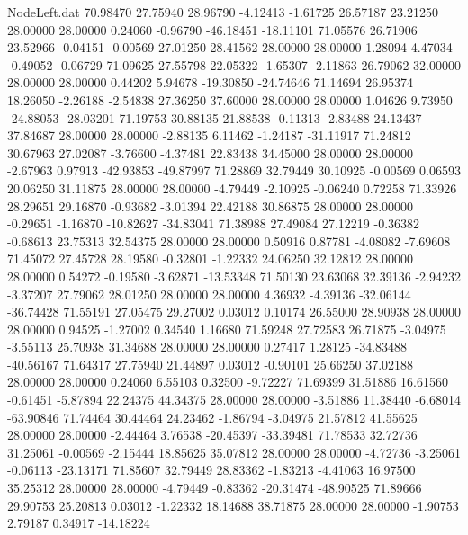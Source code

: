 \begin{filecontents}{NodeLeft.dat}
  70.98470   27.75940   28.96790    -4.12413   -1.61725   26.57187   23.21250   28.00000   28.00000    0.24060   -0.96790  -46.18451  -18.11101
  71.05576   26.71906   23.52966    -0.04151   -0.00569   27.01250   28.41562   28.00000   28.00000    1.28094    4.47034   -0.49052   -0.06729
  71.09625   27.55798   22.05322    -1.65307   -2.11863   26.79062   32.00000   28.00000   28.00000    0.44202    5.94678  -19.30850  -24.74646
  71.14694   26.95374   18.26050    -2.26188   -2.54838   27.36250   37.60000   28.00000   28.00000    1.04626    9.73950  -24.88053  -28.03201
  71.19753   30.88135   21.88538    -0.11313   -2.83488   24.13437   37.84687   28.00000   28.00000   -2.88135    6.11462   -1.24187  -31.11917
  71.24812   30.67963   27.02087    -3.76600   -4.37481   22.83438   34.45000   28.00000   28.00000   -2.67963    0.97913  -42.93853  -49.87997
  71.28869   32.79449   30.10925    -0.00569    0.06593   20.06250   31.11875   28.00000   28.00000   -4.79449   -2.10925   -0.06240    0.72258
  71.33926   28.29651   29.16870    -0.93682   -3.01394   22.42188   30.86875   28.00000   28.00000   -0.29651   -1.16870  -10.82627  -34.83041
  71.38988   27.49084   27.12219    -0.36382   -0.68613   23.75313   32.54375   28.00000   28.00000    0.50916    0.87781   -4.08082   -7.69608
  71.45072   27.45728   28.19580    -0.32801   -1.22332   24.06250   32.12812   28.00000   28.00000    0.54272   -0.19580   -3.62871  -13.53348
  71.50130   23.63068   32.39136    -2.94232   -3.37207   27.79062   28.01250   28.00000   28.00000    4.36932   -4.39136  -32.06144  -36.74428
  71.55191   27.05475   29.27002     0.03012    0.10174   26.55000   28.90938   28.00000   28.00000    0.94525   -1.27002    0.34540    1.16680
  71.59248   27.72583   26.71875    -3.04975   -3.55113   25.70938   31.34688   28.00000   28.00000    0.27417    1.28125  -34.83488  -40.56167
  71.64317   27.75940   21.44897     0.03012   -0.90101   25.66250   37.02188   28.00000   28.00000    0.24060    6.55103    0.32500   -9.72227
  71.69399   31.51886   16.61560    -0.61451   -5.87894   22.24375   44.34375   28.00000   28.00000   -3.51886   11.38440   -6.68014  -63.90846
  71.74464   30.44464   24.23462    -1.86794   -3.04975   21.57812   41.55625   28.00000   28.00000   -2.44464    3.76538  -20.45397  -33.39481
  71.78533   32.72736   31.25061    -0.00569   -2.15444   18.85625   35.07812   28.00000   28.00000   -4.72736   -3.25061   -0.06113  -23.13171
  71.85607   32.79449   28.83362    -1.83213   -4.41063   16.97500   35.25312   28.00000   28.00000   -4.79449   -0.83362  -20.31474  -48.90525
  71.89666   29.90753   25.20813     0.03012   -1.22332   18.14688   38.71875   28.00000   28.00000   -1.90753    2.79187    0.34917  -14.18224

\end{filecontents}
